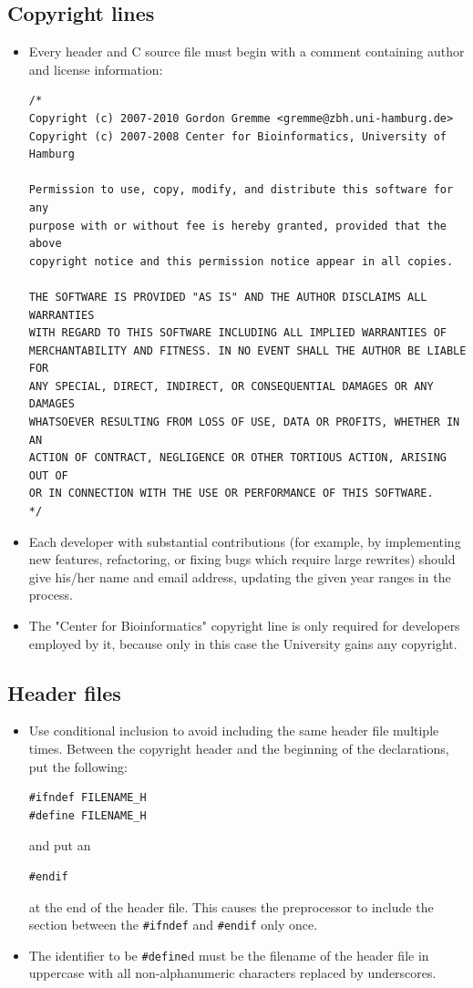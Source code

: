 \documentclass[11pt,final]{article}
\newcommand{\keyword}[1]{\lstinline{#1}}
\begin{document}
\subsection{Copyright lines}
\label{copyright}
\begin{itemize}
\item
Every header and C source file must begin with a comment containing author and
license information:
\begin{lstlisting}
/*
Copyright (c) 2007-2010 Gordon Gremme <gremme@zbh.uni-hamburg.de>
Copyright (c) 2007-2008 Center for Bioinformatics, University of Hamburg

Permission to use, copy, modify, and distribute this software for any
purpose with or without fee is hereby granted, provided that the above
copyright notice and this permission notice appear in all copies.

THE SOFTWARE IS PROVIDED "AS IS" AND THE AUTHOR DISCLAIMS ALL WARRANTIES
WITH REGARD TO THIS SOFTWARE INCLUDING ALL IMPLIED WARRANTIES OF
MERCHANTABILITY AND FITNESS. IN NO EVENT SHALL THE AUTHOR BE LIABLE FOR
ANY SPECIAL, DIRECT, INDIRECT, OR CONSEQUENTIAL DAMAGES OR ANY DAMAGES
WHATSOEVER RESULTING FROM LOSS OF USE, DATA OR PROFITS, WHETHER IN AN
ACTION OF CONTRACT, NEGLIGENCE OR OTHER TORTIOUS ACTION, ARISING OUT OF
OR IN CONNECTION WITH THE USE OR PERFORMANCE OF THIS SOFTWARE.
*/
\end{lstlisting}
\item
Each developer with substantial contributions (for example, by implementing new
features, refactoring, or fixing bugs which require large rewrites) should
give his/her name and email address, updating the given year ranges in the
process.
\item The "Center for Bioinformatics" copyright line is only required for
developers employed by it, because only in this case the University gains any
copyright.
\end{itemize}

\subsection{Header files}
\begin{itemize}
\item
Use conditional inclusion to avoid including the same header file multiple
times. Between the copyright header and the beginning of the declarations, put
the following:
\begin{lstlisting}
#ifndef FILENAME_H
#define FILENAME_H
\end{lstlisting}
and put an
\begin{lstlisting}
#endif
\end{lstlisting}
at the end of the header file.
This causes the preprocessor to include the section between the
\keyword{#ifndef} and \keyword{#endif} only once.
\item
The identifier to be \keyword{#define}d must be the filename of the header
file in uppercase with all non-alphanumeric characters replaced by underscores.
\end{itemize}
\end{document}
